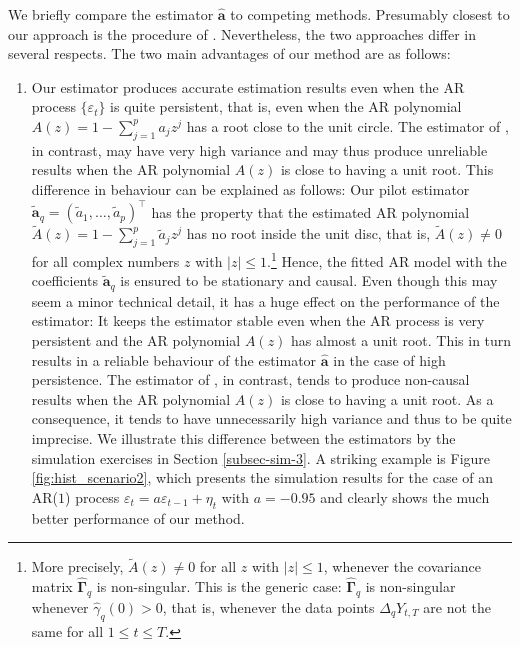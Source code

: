 We briefly compare the estimator $\widehat{\boldsymbol{a}}$ to competing methods. Presumably closest to our approach is the procedure of \cite{Hall2003}. Nevertheless, the two approaches differ in several respects. The two main advantages of our method are as follows: 
\begin{enumerate}[label=(\alph*),leftmargin=0.7cm]
\item Our estimator produces accurate estimation results even when the AR process $\{\varepsilon_t\}$ is quite persistent, that is, even when the AR polynomial $A(z) = 1 - \sum_{j=1}^p a_j z^j$ has a root close to the unit circle. The estimator of \cite{Hall2003}, in contrast, may have very high variance and may thus produce unreliable results when the AR polynomial $A(z)$ is close to having a unit root. This difference in behaviour can be explained as follows: Our pilot estimator $\widetilde{\boldsymbol{a}}_q = (\widetilde{a}_1,\ldots,\widetilde{a}_p)^\top$ has the property that the estimated AR polynomial $\widetilde{A}(z) = 1 - \sum_{j=1}^p \widetilde{a}_j z^j$ has no root inside the unit disc, that is, $\widetilde{A}(z) \ne 0$ for all complex numbers $z$ with $|z| \le 1$.\footnote{More precisely, $\widetilde{A}(z) \ne 0$ for all $z$ with $|z| \le 1$, whenever the covariance matrix $\widehat{\boldsymbol{\Gamma}}_q$ is non-singular. This is the generic case: $\widehat{\boldsymbol{\Gamma}}_q$ is non-singular whenever $\widehat{\gamma}_q(0) > 0$, that is, whenever the data points $\Delta_q Y_{t,T}$ are not the same for all $1 \le t \le T$.} Hence, the fitted AR model with the coefficients $\widetilde{\boldsymbol{a}}_q$ is ensured to be stationary and causal. Even though this may seem a minor technical detail, it has a huge effect on the performance of the estimator: It keeps the estimator stable even when the AR process is very persistent and the AR polynomial $A(z)$ has almost a unit root. This in turn results in a reliable behaviour of the estimator $\widehat{\boldsymbol{a}}$ in the case of high persistence. The estimator of \cite{Hall2003}, in contrast, tends to produce non-causal results when the AR polynomial $A(z)$ is close to having a unit root. As a consequence, it tends to have unnecessarily high variance and thus to be quite imprecise. We illustrate this difference between the estimators by the simulation exercises in Section \ref{subsec-sim-3}. A striking example is Figure \ref{fig:hist_scenario2}, which presents the simulation results for the case of an AR($1$) process $\varepsilon_t = a \varepsilon_{t-1} + \eta_t$ with $a = -0.95$ and clearly shows the much better performance of our method.  

\end{enumerate}

